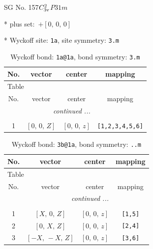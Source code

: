 \documentclass[fleqn,8pt]{jsarticle}
\begin{document}
\setcounter{MaxMatrixCols}{32}

\renewcommand{\tablename}{Table~}
\renewcommand{\figurename}{Figure~}
\begin{center}
\LARGE
SG No. 157\quad$C_{\rm 3v}^{2}$\quad$P31m$\quad[ trigonal ]
\end{center}

* plus set:\,\,\,$+\left[ 0,\, 0,\, 0 \right]$


* Wyckoff site: {\tt 1a}, site symmetry: {\tt 3.m}
\renewcommand{\arraystretch}{1.2}
\begin{longtable}{cccc}
\caption{Wyckoff bond: {\tt 1a@1a}, bond symmetry: {\tt 3.m}}
 \\
 \hline \hline
No. & vector & center & mapping \\ \hline \endfirsthead

\multicolumn{3}{l}{\tablename\ \thetable{}} \\
 \hline \hline
No. & vector & center & mapping \\ \hline \endhead

 \hline \hline
\multicolumn{3}{r}{\footnotesize\it continued ...} \\ \endfoot

 \hline \hline
\multicolumn{3}{r}{} \\ \endlastfoot

1 & $\left[ 0,\, 0,\, Z \right]$ & $\left[ 0,\, 0,\, z \right]$ & {\tt [1,2,3,4,5,6]} \\
\end{longtable}
\renewcommand{\arraystretch}{1.2}
\begin{longtable}{cccc}
\caption{Wyckoff bond: {\tt 3b@1a}, bond symmetry: {\tt ..m}}
 \\
 \hline \hline
No. & vector & center & mapping \\ \hline \endfirsthead

\multicolumn{3}{l}{\tablename\ \thetable{}} \\
 \hline \hline
No. & vector & center & mapping \\ \hline \endhead

 \hline \hline
\multicolumn{3}{r}{\footnotesize\it continued ...} \\ \endfoot

 \hline \hline
\multicolumn{3}{r}{} \\ \endlastfoot

1 & $\left[ X,\, 0,\, Z \right]$ & $\left[ 0,\, 0,\, z \right]$ & {\tt [1,5]} \\ \hline
2 & $\left[ 0,\, X,\, Z \right]$ & $\left[ 0,\, 0,\, z \right]$ & {\tt [2,4]} \\ \hline
3 & $\left[ - X,\, - X,\, Z \right]$ & $\left[ 0,\, 0,\, z \right]$ & {\tt [3,6]} \\
\end{longtable}
\end{document}

